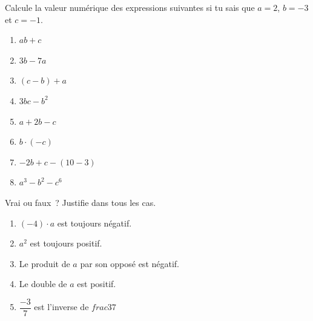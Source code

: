 \documentclass[parskip=half-, 12pt, DIV=15, twoside=semi]{scrbook}
\begin{document}
\begin{exercise}
    Calcule la valeur numérique des expressions suivantes si tu sais que
    \(a = 2\), \(b = - 3\) et \(c = - 1\).
    \begin{enumerate}[cols=3, itemsep=.4cm]
        \item \(ab + c\)
        \item \(3b - 7a\)
        \item \((c - b) + a\)
        \item \(3bc - b^{2}\)
        \item \(a + 2b - c\)
        \item \(b \cdot ( - c)\)
        \item \(-2b+c-(10-3)\)
        \item \(a^3 - b^2 - c^6\)
    \end{enumerate}
\end{exercise}

\begin{exercise}
    Vrai ou faux~? Justifie dans tous les cas.
    \begin{enumerate}
        \item \(( - 4) \cdot a\) est toujours négatif.
        \item \(a^{2}\) est toujours positif.
        \item Le produit de \(a\) par son opposé est négatif.
        \item Le double de \(a\) est positif.
        \item \(\dfrac{-3}{7}\) est l'inverse de \(frac{3}{7}\)
    \end{enumerate}
\end{exercise}
\end{document}
